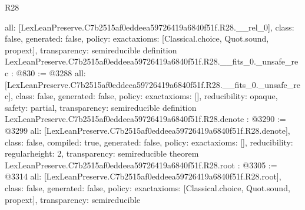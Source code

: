 \begin{lexlean}{R28}
\begin{coremodule}
{  all: [LexLeanPreserve.C7b2515af0eddeea59726419a6840f51f.R28.__rel_0],
  class: false,
  generated: false,
  policy: exact{axioms: [Classical.choice, Quot.sound, propext]},
  transparency: semireducible
}
definition LexLeanPreserve.C7b2515af0eddeea59726419a6840f51f.R28.__fits_0._unsafe_rec : @830 := @3288 {
  all: [LexLeanPreserve.C7b2515af0eddeea59726419a6840f51f.R28.__fits_0._unsafe_rec],
  class: false,
  generated: false,
  policy: exact{axioms: []},
  reducibility: opaque{},
  safety: partial,
  transparency: semireducible
}
definition LexLeanPreserve.C7b2515af0eddeea59726419a6840f51f.R28.denote : @3290 := @3299 {
  all: [LexLeanPreserve.C7b2515af0eddeea59726419a6840f51f.R28.denote],
  class: false,
  compiled: true,
  generated: false,
  policy: exact{axioms: []},
  reducibility: regular{height: 2},
  transparency: semireducible
}
theorem LexLeanPreserve.C7b2515af0eddeea59726419a6840f51f.R28.root : @3305 := @3314 {
  all: [LexLeanPreserve.C7b2515af0eddeea59726419a6840f51f.R28.root],
  class: false,
  generated: false,
  policy: exact{axioms: [Classical.choice, Quot.sound, propext]},
  transparency: semireducible
}


\end{coremodule}
\end{lexlean}
